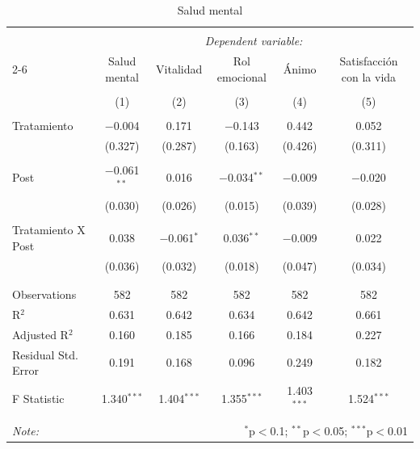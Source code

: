 
\begin{table}[H] \centering 
  \caption{Salud mental} 
  \label{reg_mental} 
\tiny 
\begin{tabular}{@{\extracolsep{-7pt}}lccccc} 
\\[-1.8ex]\hline 
\hline \\[-1.8ex] 
 & \multicolumn{5}{c}{\textit{Dependent variable:}} \\ 
\cline{2-6} 
 & Salud mental & Vitalidad & Rol emocional & Ánimo & Satisfacción con la vida \\ 
\\[-1.8ex] & (1) & (2) & (3) & (4) & (5)\\ 
\hline \\[-1.8ex] 
 Tratamiento & $-$0.004 & 0.171 & $-$0.143 & 0.442 & 0.052 \\ 
  & (0.327) & (0.287) & (0.163) & (0.426) & (0.311) \\ 
  & & & & & \\ 
 Post & $-$0.061$^{**}$ & 0.016 & $-$0.034$^{**}$ & $-$0.009 & $-$0.020 \\ 
  & (0.030) & (0.026) & (0.015) & (0.039) & (0.028) \\ 
  & & & & & \\ 
 Tratamiento X Post & 0.038 & $-$0.061$^{*}$ & 0.036$^{**}$ & $-$0.009 & 0.022 \\ 
  & (0.036) & (0.032) & (0.018) & (0.047) & (0.034) \\ 
  & & & & & \\ 
\hline \\[-1.8ex] 
Observations & 582 & 582 & 582 & 582 & 582 \\ 
R$^{2}$ & 0.631 & 0.642 & 0.634 & 0.642 & 0.661 \\ 
Adjusted R$^{2}$ & 0.160 & 0.185 & 0.166 & 0.184 & 0.227 \\ 
Residual Std. Error & 0.191 & 0.168 & 0.096 & 0.249 & 0.182 \\ 
F Statistic & 1.340$^{***}$ & 1.404$^{***}$ & 1.355$^{***}$ & 1.403$^{***}$ & 1.524$^{***}$ \\ 
\hline 
\hline \\[-1.8ex] 
\textit{Note:}  & \multicolumn{5}{r}{$^{*}$p$<$0.1; $^{**}$p$<$0.05; $^{***}$p$<$0.01} \\ 
\end{tabular} 
\end{table} 
